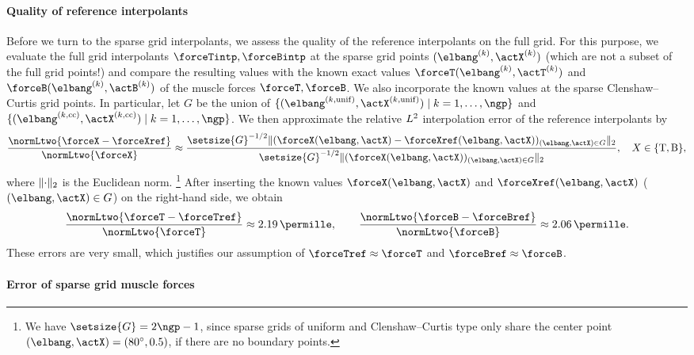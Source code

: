 \paragraph{Quality of reference interpolants}

Before we turn to the sparse grid interpolants,
we assess the quality of the reference interpolants on the full grid.
For this purpose, we evaluate the full grid interpolants
$\forceTintp, \forceBintp$
at the sparse grid points $(\elbang^{(k)}, \actX^{(k)})$
(which are not a subset of the full grid points!)
and compare the resulting values with the known exact values
$\forceT(\elbang^{(k)}, \actT^{(k)})$ and
$\forceB(\elbang^{(k)}, \actB^{(k)})$
of the muscle forces $\forceT, \forceB$.
We also incorporate the known values at the sparse
Clenshaw--Curtis grid points.
In particular, let $G$ be the union of
$\{(\elbang^{(k,\mathrm{unif})}, \actX^{(k,\mathrm{unif})}) \mid
k = 1, \dotsc, \ngp\}$ and
$\{(\elbang^{(k,\cc)}, \actX^{(k,\cc)}) \mid k = 1, \dotsc, \ngp\}$.
We then approximate the relative $L^2$ interpolation error
of the reference interpolants by
\begin{equation}
  \frac{\normLtwo{\forceX - \forceXref}}{\normLtwo{\forceX}}
  \approx
  \frac{
    \setsize{G}^{-1/2}
    \norm[2]{
      (\forceX(\elbang, \actX) - \forceXref(\elbang, \actX))_
      {(\elbang, \actX) \in G}
    }
  }{
    \setsize{G}^{-1/2}
    \norm[2]{(\forceX(\elbang, \actX))_{(\elbang, \actX) \in G}}
  },\quad
  X \in \{\mathrm{T}, \mathrm{B}\},
\end{equation}
where $\norm[2]{\cdot}$ is the Euclidean norm.%
\footnote{%
  We have $\setsize{G} = 2\ngp - 1$, since sparse grids of
  uniform and Clenshaw--Curtis type only
  share the center point $(\elbang, \actX) = (\ang{80}, 0.5)$,
  if there are no boundary points.%
}
After inserting the known values $\forceX(\elbang, \actX)$ and
$\forceXref(\elbang, \actX)$ ($(\elbang, \actX) \in G$)
on the right-hand side, %
we obtain
\begin{equation}
  \frac{\normLtwo{\forceT - \forceTref}}{\normLtwo{\forceT}}
  \approx \SI{2.19}{\permille},\qquad
  \frac{\normLtwo{\forceB - \forceBref}}{\normLtwo{\forceB}}
  \approx \SI{2.06}{\permille}.
\end{equation}
These errors are very small, which justifies our assumption of
$\forceTref \approx \forceT$ and $\forceBref \approx \forceB$.

\paragraph{Error of sparse grid muscle forces}

